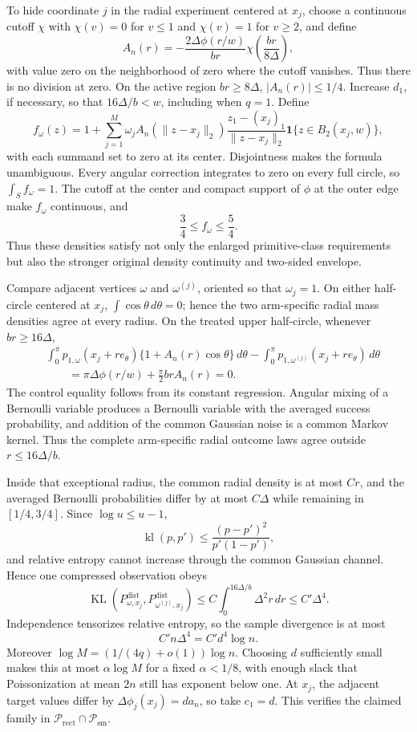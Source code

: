 To hide coordinate \(j\) in the radial experiment centered at \(x_j\), choose a continuous cutoff \(\chi\) with \(\chi(v)=0\) for \(v\leq1\) and \(\chi(v)=1\) for \(v\geq2\), and define
\[
 A_n(r)=-\frac{2\Delta\phi(r/w)}{br}
 \chi\!\left(\frac{br}{8\Delta}\right),
\]
with value zero on the neighborhood of zero where the cutoff vanishes.  Thus there is no division at zero.  On the active region \(br\geq8\Delta\), \(|A_n(r)|\leq1/4\).  Increase \(d_1\), if necessary, so that \(16\Delta/b<w\), including when \(q=1\).  Define
\[
 f_\omega(z)=1+\sum_{j=1}^M\omega_jA_n(\lVert z-x_j\rVert_2)
 \frac{z_1-(x_j)_1}{\lVert z-x_j\rVert_2}
 \mathbf1\{z\in B_2(x_j,w)\},
\]
with each summand set to zero at its center.  Disjointness makes the formula unambiguous.  Every angular correction integrates to zero on every full circle, so \(\int_Sf_\omega=1\).  The cutoff at the center and compact support of \(\phi\) at the outer edge make \(f_\omega\) continuous, and
\[
 \frac34\leq f_\omega\leq\frac54.
\]
Thus these densities satisfy not only the enlarged primitive-class requirements but also the stronger original density continuity and two-sided envelope.

Compare adjacent vertices \(\omega\) and \(\omega^{(j)}\), oriented so that \(\omega_j=1\).  On either half-circle centered at \(x_j\), \(\int\cos\theta\,d\theta=0\); hence the two arm-specific radial mass densities agree at every radius.  On the treated upper half-circle, whenever \(br\geq16\Delta\),
\[
\begin{aligned}
 &\int_0^\pi p_{1,\omega}(x_j+r e_\theta)
       \{1+A_n(r)\cos\theta\}\,d\theta
 -\int_0^\pi p_{1,\omega^{(j)}}(x_j+r e_\theta)\,d\theta\\
 &\qquad=\pi\Delta\phi(r/w)+\frac\pi2brA_n(r)=0.
\end{aligned}
\]
The control equality follows from its constant regression.  Angular mixing of a Bernoulli variable produces a Bernoulli variable with the averaged success probability, and addition of the common Gaussian noise is a common Markov kernel.  Thus the complete arm-specific radial outcome laws agree outside \(r\leq16\Delta/b\).

Inside that exceptional radius, the common radial density is at most \(Cr\), and the averaged Bernoulli probabilities differ by at most \(C\Delta\) while remaining in \([1/4,3/4]\).  Since \(\log u\leq u-1\),
\[
 \operatorname{kl}(p,p')\leq\frac{(p-p')^2}{p'(1-p')},
\]
and relative entropy cannot increase through the common Gaussian channel.  Hence one compressed observation obeys
\[
 \operatorname{KL}(P^{\mathrm{dist}}_{\omega,x_j},
 P^{\mathrm{dist}}_{\omega^{(j)},x_j})
 \leq C\int_0^{16\Delta/b}\Delta^2r\,dr
 \leq C'\Delta^4.
\]
Independence tensorizes relative entropy, so the sample divergence is at most
\[
 C'n\Delta^4=C'd^4\log n.
\]
Moreover \(\log M=(1/(4q)+o(1))\log n\).  Choosing \(d\) sufficiently small makes this at most \(\alpha\log M\) for a fixed \(\alpha<1/8\), with enough slack that Poissonization at mean \(2n\) still has exponent below one.  At \(x_j\), the adjacent target values differ by \(\Delta\phi_j(x_j)=d a_n\), so take \(c_1=d\).  This verifies the claimed family in \(\mathcal P_{\mathrm{rect}}\cap\mathcal P_{\mathrm{sm}}\).

